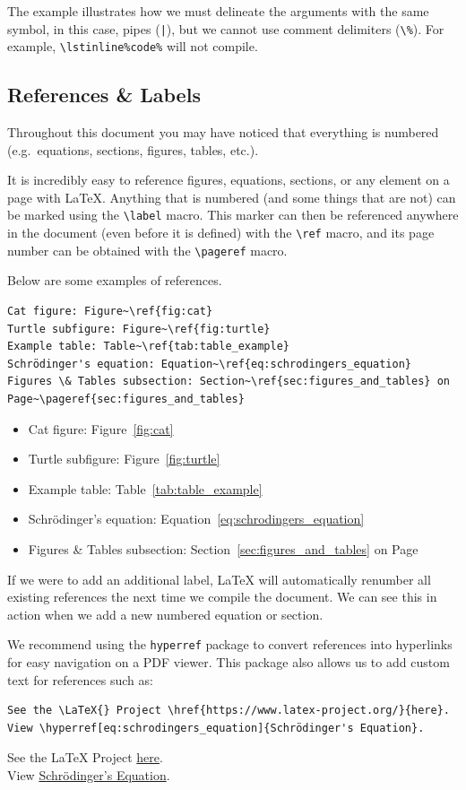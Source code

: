 \documentclass[11pt, twoside]{article}
\begin{document}
The example illustrates how we must delineate the arguments with the same symbol, in this case, pipes (\lstinline{|}), but we cannot use comment delimiters (\lstinline{\%}). For example, \lstinline|\lstinline%code%| will not compile.
\subsection{References \& Labels}
Throughout this document you may have noticed that everything is numbered (e.g.\ equations, sections, figures, tables, etc.).

It is incredibly easy to reference figures, equations, sections, or any element on a page with \LaTeX{}. Anything that is numbered (and some things that are not) can be marked using the \lstinline{\label} macro. This marker can then be referenced anywhere in the document (even before it is defined) with the \lstinline{\ref} macro, and its page number can be obtained with the \lstinline{\pageref} macro.

Below are some examples of references.
\begin{lstlisting}
Cat figure: Figure~\ref{fig:cat}
Turtle subfigure: Figure~\ref{fig:turtle}
Example table: Table~\ref{tab:table_example}
Schrödinger's equation: Equation~\ref{eq:schrodingers_equation}
Figures \& Tables subsection: Section~\ref{sec:figures_and_tables} on Page~\pageref{sec:figures_and_tables}    
\end{lstlisting}
\begin{itemize}
    \item Cat figure: Figure~\ref{fig:cat}
    \item Turtle subfigure: Figure~\ref{fig:turtle}
    \item Example table: Table~\ref{tab:table_example}
    \item Schrödinger's equation: Equation~\ref{eq:schrodingers_equation}
    \item Figures \& Tables subsection: Section~\ref{sec:figures_and_tables} on Page~\pageref{sec:figures_and_tables}
\end{itemize}
If we were to add an additional label, \LaTeX{} will automatically renumber all existing references the next time we compile the document. We can see this in action when we add a new numbered equation or section.

We recommend using the \lstinline{hyperref} package to convert references into hyperlinks for easy navigation on a PDF viewer.
This package also allows us to add custom text for references such as:
\begin{lstlisting}
See the \LaTeX{} Project \href{https://www.latex-project.org/}{here}.
View \hyperref[eq:schrodingers_equation]{Schrödinger's Equation}.
\end{lstlisting}
See the \LaTeX{} Project \href{https://www.latex-project.org/}{here}. \\
View \hyperref[eq:schrodingers_equation]{Schrödinger's Equation}.
\newpage
\end{document}

